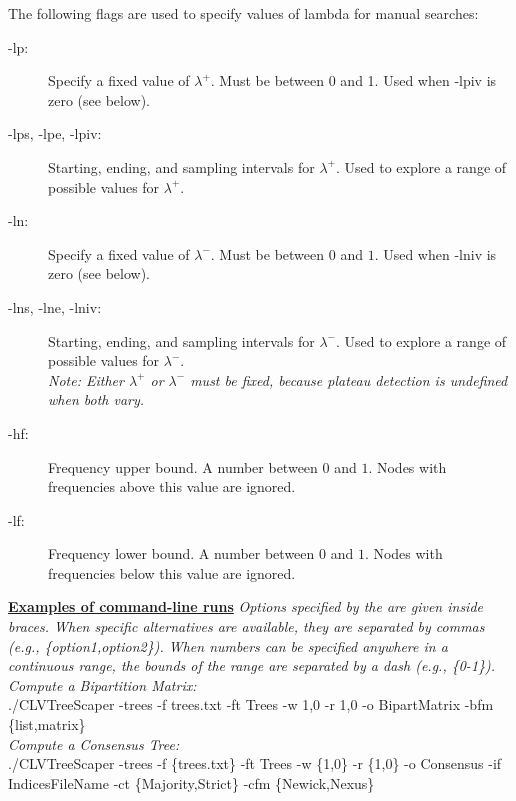 \documentclass[11pt]{article}
\begin{document}
\begin{enumerate}[{\bf (1)}]
\vspace{0.5cm}

The following flags are used to specify values of lambda for manual searches:
	\begin{description}
	\item[-lp:] Specify a fixed value of $\lambda^{+}$. Must be between 0 and 1. Used when -lpiv is zero (see below).
	
	\item[-lps, -lpe, -lpiv:] Starting, ending, and sampling intervals for $\lambda^{+}$. Used to explore a range of possible values for $\lambda^{+}$.
	
	\item[-ln:] Specify a fixed value of $\lambda^{-}$. Must be between $0$ and $1$. Used when -lniv is zero (see below).
	
	\item[-lns, -lne, -lniv:] Starting, ending, and sampling intervals for $\lambda^{-}$. Used to explore a range of possible values for $\lambda^{-}$. \\

{\it Note: Either $\lambda^{+}$ or $\lambda^{-}$ must be fixed, because plateau detection is undefined when both vary.} \\

	\item[-hf:] Frequency upper bound. A number between $0$ and $1$. Nodes with frequencies
above this value are ignored.

	\item[-lf:] Frequency lower bound. A number between $0$ and $1$. Nodes with frequencies
below this value are ignored.
	\end{description}

\vspace{0.5cm}

\ul{\bf Examples of command-line runs}
{\it Options specified by the are given inside braces. When specific alternatives are available, they
are separated by commas (e.g., \{option1,option2\}). When numbers can be specified anywhere in
a continuous range, the bounds of the range are separated by a dash (e.g., \{0-1\}).} \\


{\it Compute a Bipartition Matrix:} \\
./CLVTreeScaper -trees -f {trees.txt} -ft Trees -w {1,0} -r {1,0} -o BipartMatrix -bfm
\{list,matrix\} \\


{\it Compute a Consensus Tree:} \\
./CLVTreeScaper -trees -f \{trees.txt\} -ft Trees -w \{1,0\} -r \{1,0\} -o Consensus -if
IndicesFileName -ct \{Majority,Strict\} -cfm \{Newick,Nexus\} \\



\end{enumerate}
\end{document}
